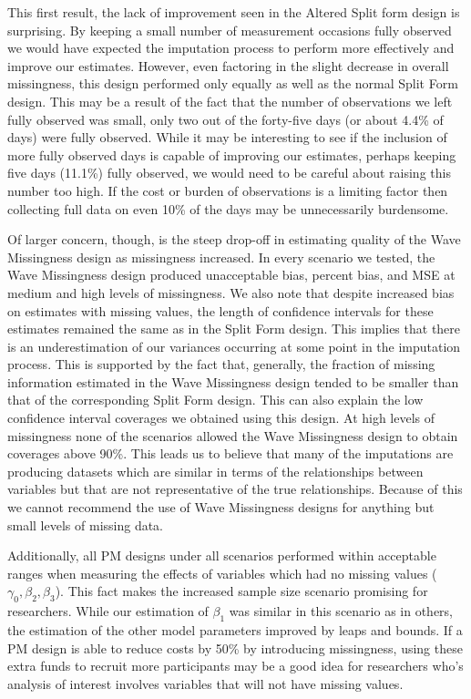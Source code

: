 \documentclass{svjour3}                     %
\begin{document}
This first result, the lack of improvement seen in the Altered Split form design is surprising. By keeping a small number of measurement occasions fully observed we would have expected the imputation process to perform more effectively and improve our estimates. However, even factoring in the slight decrease in overall missingness, this design performed only equally as well as the normal Split Form design. This may be a result of the fact that the number of observations we left fully observed was small, only two out of the forty-five days (or about 4.4\% of days) were fully observed. While it may be interesting to see if the inclusion of more fully observed days is capable of improving our estimates, perhaps keeping five days (11.1\%) fully observed, we would need to be careful about raising this number too high. If the cost or burden of observations is a limiting factor then collecting full data on even 10\% of the days may be unnecessarily burdensome. \par

Of larger concern, though, is the steep drop-off in estimating quality of the Wave Missingness design as missingness increased. In every scenario we tested, the Wave Missingness design produced unacceptable bias, percent bias, and MSE at medium and high levels of missingness. We also note that despite increased bias on estimates with missing values, the length of confidence intervals for these estimates remained the same as in the Split Form design. This implies that there is an underestimation of our variances occurring at some point in the imputation process. This is supported by the fact that, generally, the fraction of missing information estimated in the Wave Missingness design tended to be smaller than that of the corresponding Split Form design. This can also explain the low confidence interval coverages we obtained using this design. At high levels of missingness none of the scenarios allowed the Wave Missingness design to obtain coverages above 90\%. This leads us to believe that many of the imputations are producing datasets which are similar in terms of the relationships between variables but that are not representative of the true relationships. Because of this we cannot recommend the use of Wave Missingness designs for anything but small levels of missing data. \par

Additionally, all PM designs under all scenarios performed within acceptable ranges when measuring the effects of variables which had no missing values ($\gamma_0, \beta_2, \beta_3$). This fact makes the increased sample size scenario promising for researchers. While our estimation of $\beta_1$ was similar in this scenario as in others, the estimation of the other model parameters improved by leaps and bounds. If a PM design is able to reduce costs by 50\% by introducing missingness, using these extra funds to recruit more participants may be a good idea for researchers who's analysis of interest involves variables that will not have missing values. \par
\end{document}
